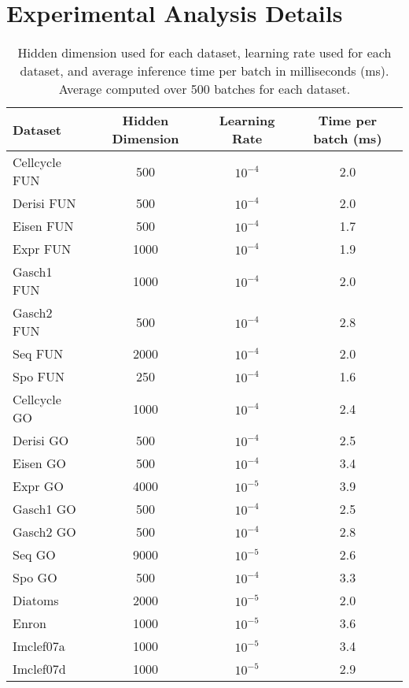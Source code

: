 \documentclass{article}
\begin{document}
\section{Experimental Analysis Details}\label{app:hidden_dim}
\begin{table}[h]
    \centering
    \caption{Hidden dimension used for each dataset, learning rate used for each dataset, and average inference time per batch in milliseconds (ms). Average computed over 500 batches for each dataset.}
    \begin{tabular}{l c c c}
        \toprule
         {\sc Dataset} & Hidden Dimension &  Learning Rate & Time per batch (ms) \\
         \midrule
         {\sc Cellcycle FUN} & 500 & $10^{-4}$ & 2.0\\
         {\sc Derisi FUN} & 500 & $10^{-4}$ & 2.0\\
         {\sc Eisen FUN} & 500 & $10^{-4}$ & 1.7\\
         {\sc Expr FUN} & 1000 & $10^{-4}$ & 1.9\\
         {\sc Gasch1 FUN} & 1000 & $10^{-4}$ & 2.0\\
         {\sc Gasch2 FUN} & 500 & $10^{-4}$ & 2.8\\
         {\sc Seq FUN} & 2000 & $10^{-4}$ & 2.0\\
         {\sc Spo FUN} & 250& $10^{-4}$ & 1.6\\
         \midrule
         {\sc Cellcycle GO} & 1000 & $10^{-4}$ & 2.4 \\
         {\sc Derisi GO} & 500 & $10^{-4}$ & 2.5\\
         {\sc Eisen GO} & 500 & $10^{-4}$ &3.4\\
         {\sc Expr GO} & 4000 & $10^{-5}$  & 3.9\\
         {\sc Gasch1 GO} & 500 & $10^{-4}$ & 2.5\\
         {\sc Gasch2 GO} & 500 & $10^{-4}$ & 2.8\\
         {\sc Seq GO} & 9000 & $10^{-5}$ & 2.6 \\
         {\sc Spo GO} & 500 & $10^{-4}$ & 3.3\\
         \midrule
         {\sc Diatoms} & 2000 & $10^{-5}$ & 2.0\\
         {\sc Enron} & 1000 & $10^{-5}$ & 3.6\\
         {\sc Imclef07a} & 1000 & $10^{-5}$ & 3.4\\
         {\sc Imclef07d} & 1000 & $10^{-5}$ & 2.9\\
         \bottomrule
    \end{tabular}
    \label{tab:hidden_dim}
\end{table}
\end{document}
